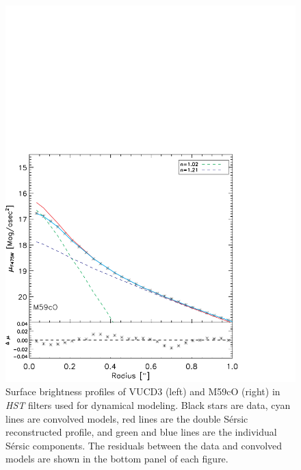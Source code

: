 \documentclass{aastex}
\begin{document}
\begin{figure}[ht!]
\begin{minipage}{0.48\textwidth}
    \includegraphics[trim={0 0 0.2cm 10cm},clip,scale=0.47]{surfbright_hstindivsersic_center_m59.pdf}%
  \end{minipage}
    
  \caption{Surface brightness profiles of VUCD3 (left) and M59cO (right) in \textit{HST} filters used for dynamical modeling.   Black stars are data, cyan lines are convolved models, red lines are the double S\'ersic reconstructed profile, and green and blue lines are the individual S\'ersic components. The residuals between the data and convolved models are shown in the bottom panel of each figure.}
  
  \label{fig:surfbright}
\end{figure}
\end{document}
